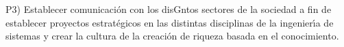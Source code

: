 P3) Establecer comunicaci\'{o}n con los disGntos sectores de la
sociedad a fin de establecer proyectos estrat\'{e}gicos en las
distintas disciplinas de la ingenier\'{\i}a de sistemas y crear la
cultura de la creaci\'{o}n de riqueza basada en el conocimiento.
